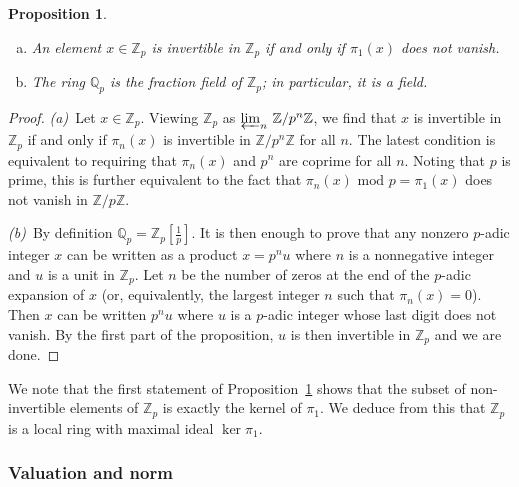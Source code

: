\documentclass[11pt]{article}
\numberwithin{equation}{section}
\numberwithin{figure}{section}
\newtheorem{prop}[theo]{Proposition}
\theoremstyle{definition}
\newcommand{\Z}{\mathbb Z}
\newcommand{\Zp}{\Z_p}
\newcommand{\Q}{\mathbb Q}
\begin{document}
\begin{prop}
\label{prop:invZp}
\begin{enumerate}[(a)]
\renewcommand{\itemsep}{0pt}
\item An element $x \in \Z_p$ is invertible in $\Z_p$ if and only
if $\pi_1(x)$ does not vanish.
\item The ring $\Q_p$ is the fraction field of $\Z_p$; in particular,
it is a field.
\end{enumerate}
\end{prop}

\begin{proof}
\emph{(a)}~Let $x \in \Z_p$.
Viewing $\Z_p$ as $\varprojlim_n \, \Z/p^n\Z$, we find that $x$ 
is invertible in $\Z_p$ if and only if $\pi_n(x)$ is invertible in
$\Z/p^n\Z$ for all $n$. The latest condition is equivalent to
requiring that $\pi_n(x)$ and $p^n$ are coprime for all $n$. 
Noting that $p$ is prime, this is further equivalent to the fact that 
$\pi_n(x) \text{ mod } p = \pi_1(x)$ does not vanish in $\Z/p\Z$.

\smallskip

\noindent
\emph{(b)}~By definition $\Q_p = \Z_p[\frac 1 p]$. It is then enough
to prove that any nonzero $p$-adic integer $x$ can be written as a
product $x = p^n u$ where $n$ is a nonnegative integer and $u$ is a
unit in $\Z_p$. Let $n$ be the number of zeros at the end of the 
$p$-adic expansion of $x$ (or, equivalently, the largest integer $n$
such that $\pi_n(x) = 0$). Then $x$ can be written $p^n u$ where $u$
is a $p$-adic integer whose last digit does not vanish. By the first
part of the proposition, $u$ is then invertible in $\Z_p$ and we are
done.
\end{proof}

We note that the first statement of Proposition~\ref{prop:invZp}
shows that the subset of non-invertible elements of $\Zp$ is exactly
the kernel of $\pi_1$. We deduce from this that $\Zp$ is a local ring
with maximal ideal $\ker \pi_1$.

\subsubsection{Valuation and norm}
\label{sssec:padicnorm}
\end{document}
